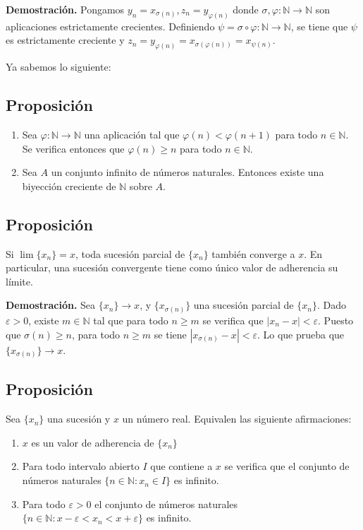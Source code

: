\documentclass[10pt,a4paper]{article}
\begin{document}
	\textbf{Demostración. }Pongamos $y_n = x_{\sigma(n)}, z_n = y_{\varphi(n)}$ donde $\sigma, \varphi : \mathbb{N} \rightarrow \mathbb{N}$ son aplicaciones estrictamente crecientes. Definiendo $\psi =\sigma \circ \varphi : \mathbb{N} \rightarrow \mathbb{N}$, se tiene que $\psi$ es estrictamente creciente y $z_n = y_{\varphi(n)} = x_{\sigma(\varphi(n))} = x_{\psi(n)}$.
	
	\quad Ya sabemos lo siguiente: 
	
	\subsection{Proposición}
	
	\begin{enumerate}[label=\roman*]
		\item Sea $\varphi : \mathbb{N} \rightarrow \mathbb{N}$ una aplicación tal que $\varphi(n) < \varphi(n+1)$ para todo $n \in \mathbb{N}$. Se verifica entonces que $\varphi(n) \geq n$ para todo $n \in \mathbb{N}$.
		\item Sea $A$ un conjunto infinito de números naturales. Entonces existe una biyección creciente de $\mathbb{N}$ sobre $A$.
	\end{enumerate}

	\subsection{Proposición}
	Si $\lim\{x_n\} = x$, toda sucesión parcial de $\{x_n\}$ también converge a $x$. En particular, una sucesión convergente tiene como único valor de adherencia su límite.
	
	\textbf{Demostración. }Sea $\{x_n\} \rightarrow x$, y $\{x_{\sigma(n)}\}$ una sucesión parcial de $\{x_n\}$. Dado $\varepsilon > 0$, existe $m \in \mathbb{N}$ tal que para todo $n \geq m$ se verifica que $|x_n - x| < \varepsilon$. Puesto que $\sigma(n) \geq n$, para todo $n \geq m$ se tiene $|x_{\sigma(n)}-x| < \varepsilon$. Lo que prueba que $\{x_{\sigma(n)}\} \rightarrow x$.
	
	\subsection{Proposición}
	
	Sea $\{x_n\}$ una sucesión y $x$ un número real. Equivalen las siguiente afirmaciones:
	\begin{enumerate}[label=\roman*]
		\item $x$ es un valor de adherencia de $\{x_n\}$
		\item Para todo intervalo abierto $I$ que contiene a $x$ se verifica que el conjunto de números naturales $\{n \in \mathbb{N}: x_n \in I\}$ es infinito.
		\item Para todo $\varepsilon > 0$ el conjunto de números naturales $\{n \in \mathbb{N}: x - \varepsilon < x_n < x + \varepsilon\}$ es infinito.
	\end{enumerate}
\end{document}

